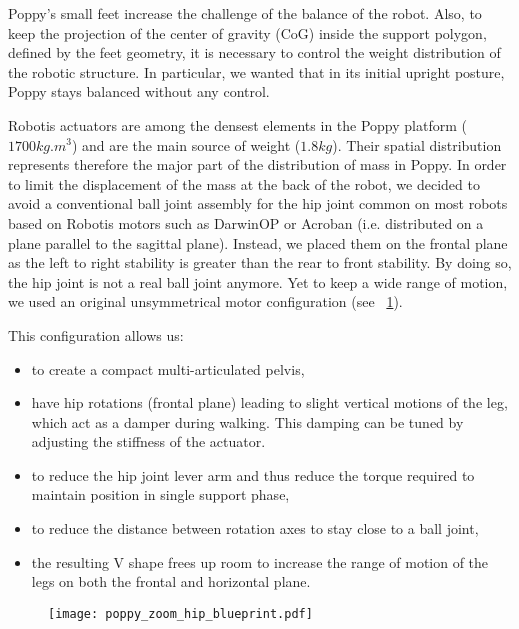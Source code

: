 Poppy's small feet increase the challenge of the balance of the robot. Also, to keep the projection of the center of gravity (CoG) inside the support polygon, defined by the feet geometry, it is necessary to control the weight distribution of the robotic structure. In particular, we wanted that in its initial upright posture, Poppy stays balanced without any control.

Robotis actuators are among the densest elements in the Poppy platform ($ 1700 kg.m^{3} $) and are the main source of weight ($1.8 kg$). Their spatial distribution represents therefore the major part of the distribution of mass in Poppy. In order to limit the displacement of the mass at the back of the robot, we decided to avoid a conventional ball joint assembly for the hip joint common on most robots based on Robotis motors such as DarwinOP or Acroban (i.e. distributed on a plane parallel to the sagittal plane). Instead, we placed them on the frontal plane as the left to right stability is greater than the rear to front stability. By doing so, the hip joint is not a real ball joint anymore. Yet to keep a wide range of motion, we used an original unsymmetrical motor configuration (see \figurename~\ref{fig:poppy_zoom_hip_blueprint}).

This configuration allows us:

\begin{itemize}
    \item to create a compact multi-articulated pelvis,
    \item have hip rotations (frontal plane) leading to slight vertical motions of the leg, which act as a damper during walking. This damping can be tuned by adjusting the stiffness of the actuator.
    \item to reduce the hip joint lever arm and thus reduce the torque required to maintain position in single support phase,
    \item to reduce the distance between rotation axes to stay close to a ball joint,
    \item the resulting V shape frees up room to increase the range of motion of the legs on both the frontal and horizontal plane.
\end{itemize}

\begin{figure}[p]
    \begin{center}
        \texttt{[image: poppy\_zoom\_hip\_blueprint.pdf]}
    \end{center}
    \caption{}
    \label{fig:poppy_zoom_hip_blueprint}
\end{figure}

